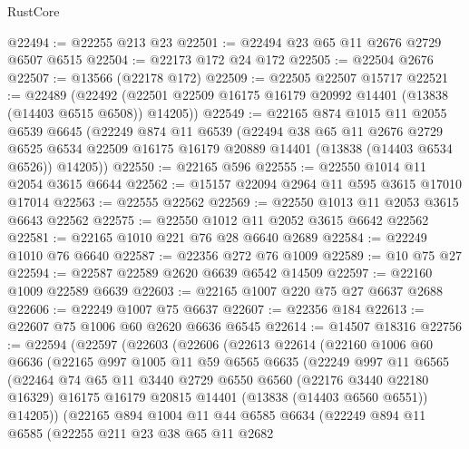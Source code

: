 \begin{lexlean}{RustCore}
\begin{coremodule}
@22494 := @22255 @213 @23
@22501 := @22494 @23 @65 @11 @2676 @2729 @6507 @6515
@22504 := @22173 @172 @24 @172
@22505 := @22504 @2676
@22507 := @13566 (@22178 @172)
@22509 := @22505 @22507 @15717
@22521 := @22489
    (@22492 (@22501 @22509 @16175 @16179 @20992 @14401 (@13838 (@14403 @6515 @6508)) @14205))
@22549 := @22165
    @874
    @1015
    @11
    @2055
    @6539
    @6645
    (@22249
      @874
      @11
      @6539
      (@22494
        @38
        @65
        @11
        @2676
        @2729
        @6525
        @6534
        @22509
        @16175
        @16179
        @20889
        @14401
        (@13838 (@14403 @6534 @6526))
        @14205))
@22550 := @22165 @596
@22555 := @22550 @1014 @11 @2054 @3615 @6644
@22562 := @15157 @22094 @2964 @11 @595 @3615 @17010 @17014
@22563 := @22555 @22562
@22569 := @22550 @1013 @11 @2053 @3615 @6643 @22562
@22575 := @22550 @1012 @11 @2052 @3615 @6642 @22562
@22581 := @22165 @1010 @221 @76 @28 @6640 @2689
@22584 := @22249 @1010 @76 @6640
@22587 := @22356 @272 @76 @1009
@22589 := @10 @75 @27
@22594 := @22587 @22589 @2620 @6639 @6542 @14509
@22597 := @22160 @1009 @22589 @6639
@22603 := @22165 @1007 @220 @75 @27 @6637 @2688
@22606 := @22249 @1007 @75 @6637
@22607 := @22356 @184
@22613 := @22607 @75 @1006 @60 @2620 @6636 @6545
@22614 := @14507 @18316
@22756 := @22594
    (@22597
      (@22603
        (@22606
          (@22613
            @22614
            (@22160
              @1006
              @60
              @6636
              (@22165
                @997
                @1005
                @11
                @59
                @6565
                @6635
                (@22249
                  @997
                  @11
                  @6565
                  (@22464
                    @74
                    @65
                    @11
                    @3440
                    @2729
                    @6550
                    @6560
                    (@22176 @3440 @22180 @16329)
                    @16175
                    @16179
                    @20815
                    @14401
                    (@13838 (@14403 @6560 @6551))
                    @14205))
                (@22165
                  @894
                  @1004
                  @11
                  @44
                  @6585
                  @6634
                  (@22249
                    @894
                    @11
                    @6585
                    (@22255
                      @211
                      @23
                      @38
                      @65
                      @11
                      @2682

\end{coremodule}
\end{lexlean}
